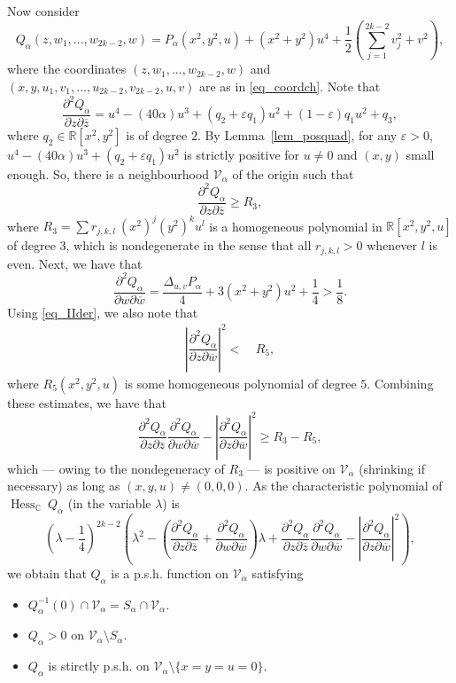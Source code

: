 \documentclass[10pt]{amsart}
\numberwithin{equation}{section}
\theoremstyle{definition}
\theoremstyle{definition}
\theoremstyle{plain}
\newcommand{\bes} {\begin{equation*}}
\newcommand{\ees} {\end{equation*}}
\newcommand{\be} {\begin{equation}}
\newcommand{\ee} {\end{equation}}
\newcommand{\eps}{\varepsilon}
\newcommand{\V}{\mathcal{V}}
\newcommand{\wbar}{\overline{w}}
\newcommand{\zbar}{\overline{z}}
\newcommand\secpartl[3]{\dfrac{\partial^2{#1}}{\partial{#2}\partial{#3}}}
\newcommand\psecpartl[2]{\dfrac{\partial^2{#1}}{\partial{#2}^2}}
\newcommand{\Chess}{\operatorname{Hess}_{ \C}\!\:}
\newcommand{\C} {\mathbb{C}}
\newcommand{\rl}{\mathbb{R}}
\begin{document}
Now consider 
	\bes
		Q_\alpha(z,w_1,...,w_{2k-2},w)
			=P_\alpha(x^2,y^2,u)+(x^2+y^2)u^4
				+\frac{1}{2}\left(\sum_{j=1}^{2k-2}v_j^2+v^2\right),
	\ees
where the coordinates $(z,w_1,...,w_{2k-2},w)$ and $(x,y,u_1,v_1,...,u_{2k-2},v_{2k-2},u,v)$ are as in \eqref{eq_coordch}. Note that
	\bes
		\secpartl{Q_\alpha}{z}{\zbar}
			=u^4-(40\alpha)u^3+(q_2+\eps q_1)u^2+(1-\eps)q_1u^2+q_3,
	\ees
where $q_2\in\rl[x^2,y^2]$ is of degree $2$. By Lemma~\ref{lem_posquad}, for any $\eps>0$, $u^4-(40\alpha)u^3+(q_2+\eps q_1)u^2$ is strictly positive for $u\neq 0$ and $(x,y)$ small enough. So, there is a neighbourhood $\V_\alpha$ of the origin such that 
		\be\label{eq_zzbar}
			\secpartl{Q_\alpha}{z}{\zbar}\geq R_3, 
		\ee
where $R_3=\sum r_{j,k,l}\ (x^2)^j (y^2)^k u^l$ is a homogeneous polynomial in $\rl[x^2,y^2,u]$ of degree $3$, which is nondegenerate in the sense that all $r_{j,k,l}>0$ whenever $l$ is even. Next, we have that 
	\be\label{eq_wwbar}
		\secpartl{Q_\alpha}{w}{\wbar}
			=\frac{\Delta_{u,v}P_\alpha}{4}+3(x^2+y^2)u^2+\frac{1}{4}>\frac{1}{8}.
	\ee
Using \eqref{eq_IIder}, we also note that
	\begin{align}
		\left|\secpartl{Q_\alpha}{z}{\wbar}\right|^2
		<&\ R_5,\label{eq_zwbar} 
	\end{align}
where $R_5(x^2,y^2,u)$ is some homogeneous polynomial of degree $5$. Combining these estimates, we have that 
	\bes	
		\secpartl{Q_\alpha}{z}{\zbar}\secpartl{Q_\alpha}{w}{\wbar}-
				\left|\secpartl{Q_\alpha}{z}{\wbar}\right|^2
			\geq R_3-R_5,
	\ees
which --- owing to the nondegeneracy of $R_3$ --- is positive on $\V_\alpha$ (shrinking if necessary) as long as $(x,y,u)\neq(0,0,0)$. As the characteristic polynomial of $\Chess Q_\alpha$ (in the variable $\lambda$) is 
	\bes
		\left(\lambda-\frac{1}{4}\right)^{2k-2}
		\left(\lambda^2-\left(\secpartl{Q_\alpha}{z}{\zbar}+\secpartl{Q_\alpha}{w}{\wbar}\right)\lambda
			+\secpartl{Q_\alpha}{z}{\zbar}\secpartl{Q_\alpha}{w}{\wbar}-
				\left|\secpartl{Q_\alpha}{z}{\wbar}\right|^2
	\right),
	\ees	
we obtain that $Q_\alpha$ is a p.s.h. function on $\V_\alpha$ satisfying
	\begin{itemize}
		\item $Q_\alpha^{-1}(0)\cap\V_\alpha=S_\alpha\cap \V_\alpha$.
		\item $Q_\alpha>0$ on $\V_\alpha\setminus S_\alpha$.
		\item $Q_\alpha$ is stirctly p.s.h. on $\V_\alpha\setminus\{x=y=u=0\}$.
	\end{itemize}
\end{document}
